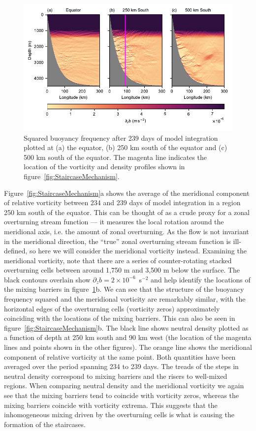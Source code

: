 \begin{figure}[t]
    \centering
    \includegraphics{../figures/Figure2.pdf}
    \caption{Squared buoyancy frequency after 239 days of model integration plotted at (a) the equator,  (b) 250 km south of the equator and (c) 500 km south of the equator. The magenta line indicates the location of the vorticity and density profiles shown in figure~\ref{fig:StaircaseMechanism}.}
    \label{fig:staircase}
\end{figure}

Figure~\ref{fig:StaircaseMechanism}a shows the average of the meridional component of relative vorticity between 234 and 239  days of model integration in a region 250 km south of the equator. This can be thought of as a crude proxy for a zonal overturning stream function --- it measures the local rotation around the meridional axis, i.e. the amount of zonal overturning. As the flow is not invariant in the meridional direction, the ``true'' zonal overturning stream function is ill-defined, so here we will consider the meridional vorticity instead. Examining the meridional vorticity, note that there are a series of counter-rotating stacked overturning cells between around 1,750 m and 3,500 m below the surface. The black contours overlain show $\partial_z b = 2 \times 10^{-6}$~s$^{-2}$ and help identify the locations of the mixing barriers in figure~\ref{fig:staircase}b. We can see that the structure of the buoyancy frequency squared and the meridional vorticity are remarkably similar, with the horizontal edges of the overturning cells (vorticity zeros) approximately coinciding with the locations of the mixing barriers. This can also be seen in figure~\ref{fig:StaircaseMechanism}b. The black line shows neutral density plotted as a function of depth at 250 km south and 90 km west (the location of the magenta lines and points shown in the other figures). The orange line shows the meridional component of relative vorticity at the same point. Both quantities have been averaged over the period spanning 234 to 239 days. The treads of the steps in neutral density correspond to mixing barriers and the risers to well-mixed regions. When comparing neutral density and the meridional vorticity we again see that the mixing barriers tend to coincide with vorticity zeros, whereas the mixing barriers coincide with vorticity extrema. This suggests that the inhomogeneous mixing driven by the overturning cells is what is causing the formation of the staircases.

